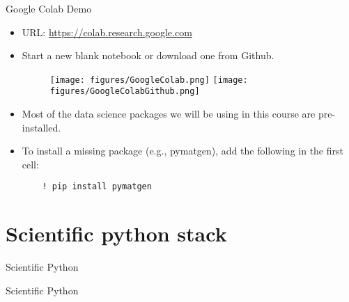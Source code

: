 \documentclass[aspectratio=169]{beamer}
\begin{document}
    \begin{frame}[fragile]{Google Colab Demo}
        \begin{itemize}
            \item URL: \url{https://colab.research.google.com}
            \item Start a new blank notebook or download one from Github.
            \begin{figure}
                \centering
                \texttt{[image: figures/GoogleColab.png]}
                \texttt{[image: figures/GoogleColabGithub.png]}
            \end{figure}
            \item Most of the data science packages we will be using in this course are pre-installed.
            \item To install a missing package (e.g., pymatgen), add the following in the first cell:
            \begin{verbatim}
    ! pip install pymatgen
            \end{verbatim}
        \end{itemize}
    \end{frame}


    \section{Scientific python stack}

    \begin{frame}{Scientific Python}
        \Huge{\centerline{Scientific Python}}
    \end{frame}
\end{document}
